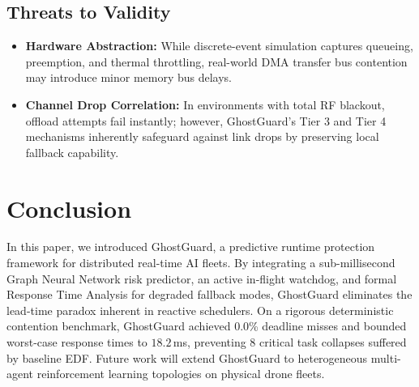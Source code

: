 \documentclass[10pt,conference]{IEEEtran}
\begin{document}
\subsection{Threats to Validity}
\begin{itemize}
    \item \textbf{Hardware Abstraction:} While discrete-event simulation captures queueing, preemption, and thermal throttling, real-world DMA transfer bus contention may introduce minor memory bus delays.
    \item \textbf{Channel Drop Correlation:} In environments with total RF blackout, offload attempts fail instantly; however, GhostGuard's Tier 3 and Tier 4 mechanisms inherently safeguard against link drops by preserving local fallback capability.
\end{itemize}

\section{Conclusion}
\label{sec:conclusion}

In this paper, we introduced GhostGuard, a predictive runtime protection framework for distributed real-time AI fleets. By integrating a sub-millisecond Graph Neural Network risk predictor, an active in-flight watchdog, and formal Response Time Analysis for degraded fallback modes, GhostGuard eliminates the lead-time paradox inherent in reactive schedulers. On a rigorous deterministic contention benchmark, GhostGuard achieved 0.0\% deadline misses and bounded worst-case response times to $18.2$\,ms, preventing 8 critical task collapses suffered by baseline EDF. Future work will extend GhostGuard to heterogeneous multi-agent reinforcement learning topologies on physical drone fleets.
\end{document}

